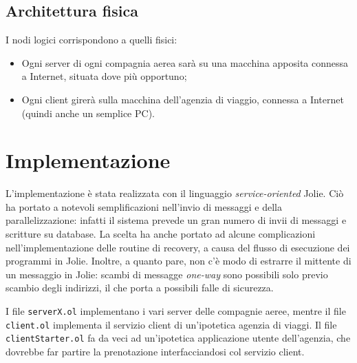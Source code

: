 \documentclass[a4paper]{article}
\begin{document}

\subsection{Architettura fisica}
I nodi logici corrispondono a quelli fisici:
\begin{itemize}
	\item Ogni server di ogni compagnia aerea sarà su una macchina apposita connessa a Internet, situata dove più opportuno;
	\item Ogni client girerà sulla macchina dell'agenzia di viaggio, connessa a Internet (quindi anche un semplice PC).
\end{itemize}


\section{Implementazione}

L'implementazione è stata realizzata con il linguaggio \textit{service-oriented} Jolie. Ciò ha portato a notevoli semplificazioni nell'invio di messaggi e della parallelizzazione: infatti il sistema prevede un gran numero di invii di messaggi e scritture su database. La scelta ha anche portato ad alcune complicazioni nell'implementazione delle routine di recovery, a causa del flusso di esecuzione dei programmi in Jolie. Inoltre, a quanto pare, non c'è modo di estrarre il mittente di un messaggio in Jolie: scambi di messagge \textit{one-way} sono possibili solo previo scambio degli indirizzi, il che porta a possibili falle di sicurezza. 

I file \texttt{serverX.ol} implementano i vari server delle compagnie aeree, mentre il file \texttt{client.ol} implementa il servizio client di un'ipotetica agenzia di viaggi. Il file \texttt{clientStarter.ol} fa da veci ad un'ipotetica applicazione utente dell'agenzia, che dovrebbe far partire la prenotazione interfacciandosi col servizio client.
\end{document}
